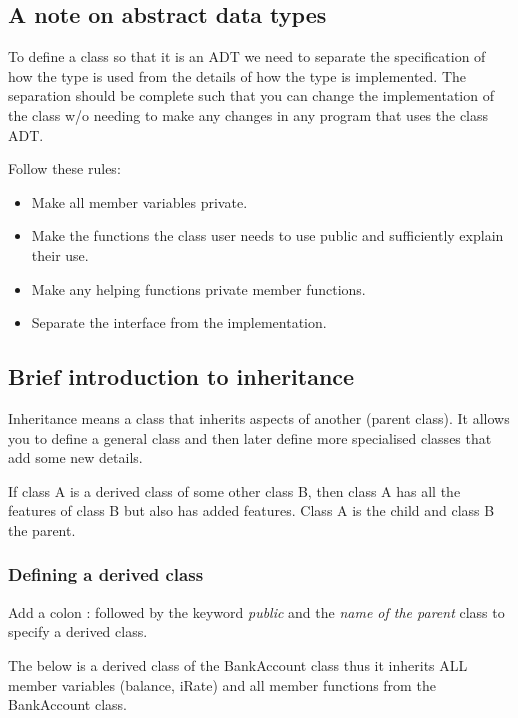 \subsection{A note on abstract data types}
To define a class so that it is an ADT we need to separate the specification
of how the type is used from the details of how the type is implemented.
The separation should be complete such that you can change the implementation
of the class w/o needing to make any changes in any program that uses the class ADT.

Follow these rules:
\begin{itemize}
	\item Make all member variables private.
	\item Make the functions the class user needs to use public and sufficiently explain
	their use.
	\item Make any helping functions private member functions.
	\item Separate the interface from the implementation.
\end{itemize}



\subsection{Brief introduction to inheritance}
Inheritance means a class that inherits aspects of another (parent class). It allows you to
define a general class and then later define more specialised classes that add some new details.

If class A is a derived class of some other class B, then class A has all the features of class B but
also has added features. Class A is the child and class B the parent.

\subsubsection*{Defining a derived class}
Add a colon : followed by the keyword \emph{public} and the \emph{name of the parent} class to
specify a derived class.

The below is a derived class of the BankAccount class thus it inherits ALL member variables
(balance, iRate) and all member functions from the BankAccount class.


